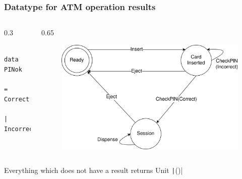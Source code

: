 \documentclass[compress]{beamer}
\begin{document}
\begin{frame}[fragile]
  \frametitle{Datatype for ATM operation results}

  \begin{columns}
  \begin{column}{0.3\framewidth}
    \begin{verbatim}
      data PINok 
        = Correct
        | Incorrect
    \end{verbatim}
  \end{column}

  \begin{column}{0.65\framewidth}
    \begin{figure}
    \includegraphics[alt={The state diagram from slide 7.},width=\textwidth]{ATM.png}
    \end{figure}
  \end{column}
  \end{columns}

  \vspace*{1cm}

  \pause

  \large

  Everything which does not have a result returns Unit {\textemdash}
  \texttt|()|

\end{frame}
\end{document}
